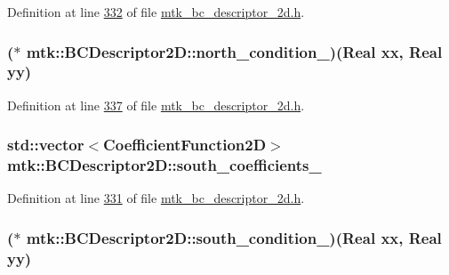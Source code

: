 Definition at line \hyperlink{mtk__bc__descriptor__2d_8h_source_l00332}{332} of file \hyperlink{mtk__bc__descriptor__2d_8h_source}{mtk\+\_\+bc\+\_\+descriptor\+\_\+2d.\+h}.

\hypertarget{classmtk_1_1BCDescriptor2D_a23e0b9ae755dcf81841aa24ddaf0b090}{
\subsubsection[{north\+\_\+condition\+\_\+}]{($\ast$ mtk\+::\+B\+C\+Descriptor2\+D\+::north\+\_\+condition\+\_\+)({\bf Real} xx, {\bf Real} yy)\hspace{0.3cm}{\ttfamily [private]}}}\label{classmtk_1_1BCDescriptor2D_a23e0b9ae755dcf81841aa24ddaf0b090}


Definition at line \hyperlink{mtk__bc__descriptor__2d_8h_source_l00337}{337} of file \hyperlink{mtk__bc__descriptor__2d_8h_source}{mtk\+\_\+bc\+\_\+descriptor\+\_\+2d.\+h}.

\hypertarget{classmtk_1_1BCDescriptor2D_a263309b9ad288dc89826d818d9378d07}{
\subsubsection[{south\+\_\+coefficients\+\_\+}]{\setlength{\rightskip}{0pt plus 5cm}std\+::vector$<${\bf Coefficient\+Function2\+D}$>$ mtk\+::\+B\+C\+Descriptor2\+D\+::south\+\_\+coefficients\+\_\+\hspace{0.3cm}{\ttfamily [private]}}}\label{classmtk_1_1BCDescriptor2D_a263309b9ad288dc89826d818d9378d07}


Definition at line \hyperlink{mtk__bc__descriptor__2d_8h_source_l00331}{331} of file \hyperlink{mtk__bc__descriptor__2d_8h_source}{mtk\+\_\+bc\+\_\+descriptor\+\_\+2d.\+h}.

\hypertarget{classmtk_1_1BCDescriptor2D_a2a933b473abbe47ad7c79ef7939e7768}{
\subsubsection[{south\+\_\+condition\+\_\+}]{($\ast$ mtk\+::\+B\+C\+Descriptor2\+D\+::south\+\_\+condition\+\_\+)({\bf Real} xx, {\bf Real} yy)\hspace{0.3cm}{\ttfamily [private]}}}\label{classmtk_1_1BCDescriptor2D_a2a933b473abbe47ad7c79ef7939e7768}


